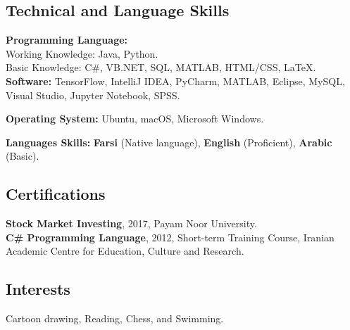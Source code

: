 \documentclass[10pt]{article}
\begin{document}
\subsection*{Technical and Language Skills}

\noindent \textbf{Programming Language:} \\
  \indent Working Knowledge: Java, Python.\\
  \indent Basic Knowledge:  C\#, VB.NET, SQL, MATLAB, HTML/CSS, \LaTeX.\\
\noindent \textbf{Software:} TensorFlow, IntelliJ IDEA, PyCharm, MATLAB, Eclipse, MySQL, Visual Studio, Jupyter Notebook, SPSS.

\noindent \textbf{Operating System:} Ubuntu, macOS, Microsoft Windows.

\noindent \textbf{Languages Skills: }\textbf {Farsi} (Native language), \textbf {English} (Proficient), \textbf {Arabic} (Basic).

\subsection*{Certifications}
\noindent \textbf{Stock Market Investing}, 2017, Payam Noor University.\\
\noindent \textbf{C\# Programming Language}, 2012, Short-term Training Course, Iranian Academic Centre for Education, Culture and Research.

\subsection*{Interests}
Cartoon drawing, Reading, Chess, and Swimming.
\end{document}
